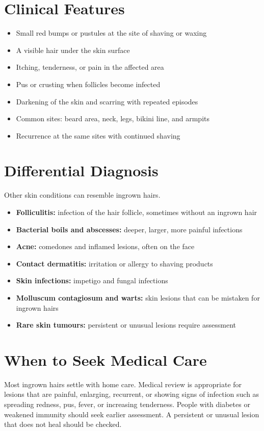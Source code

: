 \section*{Clinical Features}
\begin{itemize}
    \item Small red bumps or pustules at the site of shaving or waxing
    \item A visible hair under the skin surface
    \item Itching, tenderness, or pain in the affected area
    \item Pus or crusting when follicles become infected
    \item Darkening of the skin and scarring with repeated episodes
    \item Common sites: beard area, neck, legs, bikini line, and armpits
    \item Recurrence at the same sites with continued shaving
\end{itemize}

\section*{Differential Diagnosis}
Other skin conditions can resemble ingrown hairs.
\begin{itemize}
    \item \textbf{Folliculitis:} infection of the hair follicle, sometimes without an ingrown hair
    \item \textbf{Bacterial boils and abscesses:} deeper, larger, more painful infections
    \item \textbf{Acne:} comedones and inflamed lesions, often on the face
    \item \textbf{Contact dermatitis:} irritation or allergy to shaving products
    \item \textbf{Skin infections:} impetigo and fungal infections
    \item \textbf{Molluscum contagiosum and warts:} skin lesions that can be mistaken for ingrown hairs
    \item \textbf{Rare skin tumours:} persistent or unusual lesions require assessment
\end{itemize}

\section*{When to Seek Medical Care}
Most ingrown hairs settle with home care. Medical review is appropriate for lesions that are painful, enlarging, recurrent, or showing signs of infection such as spreading redness, pus, fever, or increasing tenderness. People with diabetes or weakened immunity should seek earlier assessment. A persistent or unusual lesion that does not heal should be checked.

